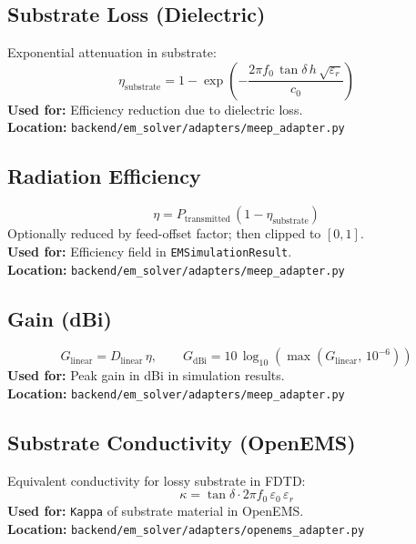 \documentclass[11pt,a4paper]{article}
\begin{document}
\subsection{Substrate Loss (Dielectric)}
Exponential attenuation in substrate:
\begin{equation}
\eta_{\mathrm{substrate}} = 1 - \exp\left(-\frac{2\pi f_0\, \tan\delta\, h\, \sqrt{\varepsilon_r}}{c_0}\right)
\end{equation}
\textbf{Used for:} Efficiency reduction due to dielectric loss. \\
\textbf{Location:} \texttt{backend/em\_solver/adapters/meep\_adapter.py}

\subsection{Radiation Efficiency}
\begin{equation}
\eta = P_{\mathrm{transmitted}}\, (1 - \eta_{\mathrm{substrate}})
\end{equation}
Optionally reduced by feed-offset factor; then clipped to \([0, 1]\). \\
\textbf{Used for:} Efficiency field in \texttt{EMSimulationResult}. \\
\textbf{Location:} \texttt{backend/em\_solver/adapters/meep\_adapter.py}

\subsection{Gain (dBi)}
\begin{equation}
G_{\mathrm{linear}} = D_{\mathrm{linear}}\, \eta,\qquad
G_{\mathrm{dBi}} = 10\,\log_{10}(\max(G_{\mathrm{linear}},\, 10^{-6}))
\end{equation}
\textbf{Used for:} Peak gain in dBi in simulation results. \\
\textbf{Location:} \texttt{backend/em\_solver/adapters/meep\_adapter.py}

\subsection{Substrate Conductivity (OpenEMS)}
Equivalent conductivity for lossy substrate in FDTD:
\begin{equation}
\kappa = \tan\delta \cdot 2\pi f_0\, \varepsilon_0\, \varepsilon_r
\end{equation}
\textbf{Used for:} \texttt{Kappa} of substrate material in OpenEMS. \\
\textbf{Location:} \texttt{backend/em\_solver/adapters/openems\_adapter.py}
\end{document}
